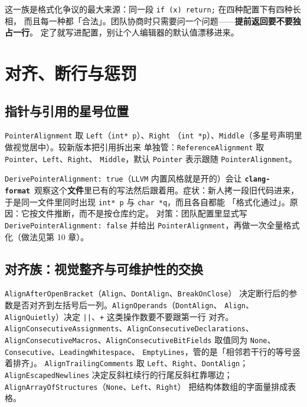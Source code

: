 \documentclass[12pt,a4paper,fontset=fandol]{ctexbook}
\newcommand{\Bk}{\discretionary{}{}{}}
\newcommand{\Lib}[1]{\textbf{\texttt{#1}}}
\newcommand{\Fmt}{\Lib{clang-format}}
\begin{document}
这一族是格式化争议的最大来源：同一段 \texttt{if (x) return;} 在四种配置下有四种长相，
而且每一种都「合法」。团队协商时只需要问一个问题——\textbf{提前返回要不要独占一行}。
定了就写进配置，别让个人编辑器的默认值漂移进来。

\section{对齐、断行与惩罚}\label{sec:ch09-s4}

\subsection{指针与引用的星号位置}\label{sec:ch09-s4-pointer}

\texttt{PointerAlignment} 取 \texttt{Left}（\texttt{int* p}）、\texttt{Right}
（\texttt{int *p}）、\texttt{Middle}（多星号声明里做视觉居中）。较新版本把引用拆出来
单独管：\texttt{ReferenceAlignment} 取 \texttt{Pointer}、\texttt{Left}、\texttt{Right}、
\texttt{Middle}，默认 \texttt{Pointer} 表示跟随 \texttt{PointerAlignment}。

\begin{warning}[title={\texttt{DerivePointerAlignment} 让同一仓库出现两种星号}]
  \texttt{DerivePointerAlignment: true}（\texttt{LLVM} 内置风格就是开的）会让 \Fmt\
  观察这个\textbf{文件}里已有的写法然后跟着用。症状：新人拷一段旧代码进来，
  于是同一文件里同时出现 \texttt{int* p} 与 \texttt{char *q}，而且各自都能
  「格式化通过」。原因：它按文件推断，而不是按仓库约定。
  对策：团队配置里显式写 \texttt{DerivePointerAlignment: false} 并给出
  \texttt{PointerAlignment}，再做一次全量格式化（做法见第 10 章）。
\end{warning}

\subsection{对齐族：视觉整齐与可维护性的交换}\label{sec:ch09-s4-align}

\texttt{AlignAfterOpenBracket}（\texttt{Align}、\texttt{DontAlign}、\texttt{BreakOnClose}）
决定断行后的参数是否对齐到左括号后一列。\texttt{AlignOperands}（\texttt{DontAlign}、
\texttt{Align}、\texttt{AlignQuietly}）决定 \texttt{||}、\texttt{+} 这类操作数要不要跟第一行
对齐。\texttt{AlignConsecutive\Bk Assignments}、\texttt{AlignConsecutive\Bk Declarations}、
\texttt{AlignConsecutive\Bk Macros}、\texttt{AlignConsecutive\Bk BitFields}
取值同为 \texttt{None}、\texttt{Consecutive}、\texttt{LeadingWhitespace}、
\texttt{EmptyLines}，管的是「相邻若干行的等号竖着排齐」。
\texttt{AlignTrailingComments} 取 \texttt{Left}、\texttt{Right}、\texttt{DontAlign}；
\texttt{AlignEscapedNewlines} 决定反斜杠续行的行尾反斜杠靠哪边；
\texttt{AlignArrayOfStructures}（\texttt{None}、\texttt{Left}、\texttt{Right}）
把结构体数组的字面量排成表格。
\end{document}
